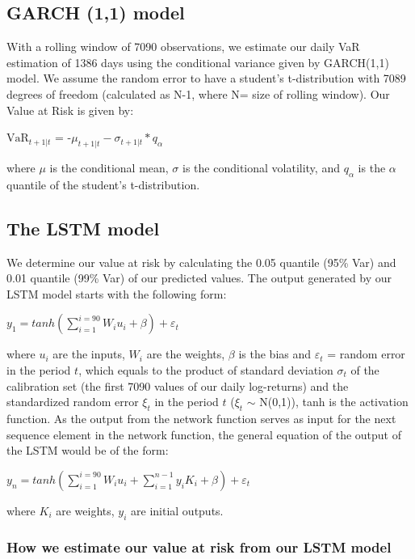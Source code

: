 \documentclass[a4paper,11pt,oneside]{book}
\begin{document}
\subsection{GARCH (1,1) model}

With a rolling window of 7090 observations, we estimate our daily VaR estimation of 1386 days using the conditional variance given by GARCH(1,1) model. We assume the random error to have a student’s t-distribution with 7089 degrees of freedom (calculated as N-1, where N= size of rolling window). Our Value at Risk is given by:
\begin{center}
$\text{VaR}_{t+1|t}$ = -$\mu_{t+1|t} - \sigma_{t+1|t} * q_{\alpha}$
\end{center}
where $\mu$ is the conditional mean, $\sigma$ is the conditional volatility, and $q_{\alpha}$ is the $\alpha$ quantile of the student's t-distribution.

\subsection{The LSTM model}
We determine our value at risk by calculating the 0.05 quantile (95\% Var) and 0.01 quantile (99\% Var) of our predicted values. The output generated by our LSTM model starts with the following form:
\begin{center}
	$y_1= tanh(\sum_{i=1}^{i=90}W_{i}u_{i}+\beta)+\varepsilon_t$
\end{center} 

where $u_{i}$ are the inputs, $W_i$ are the weights, $\beta$ is the bias and $\varepsilon_t$ = random error in the period $t$, which equals to the
product of standard deviation $\sigma_t$ of the calibration set (the first 7090 values of our daily log-returns) and  the
standardized random error $\xi_t$ in the period $t$ ($\xi_t$ $\sim$ N(0,1)), tanh is the activation function. As the output from the network function serves as input for the next sequence element in the network function, the general equation of the output of the LSTM would be of the form:

\begin{center}
	$y_n= tanh(\sum_{i=1}^{i=90}W_{i}u_{i}+\sum_{i=1}^{n-1}y_{i}K_{i}+\beta)+\varepsilon_t$
\end{center} 
where $K_i$ are weights, $y_i$ are initial outputs.

\subsubsection{How we estimate our value at risk from our LSTM model}
\end{document}
